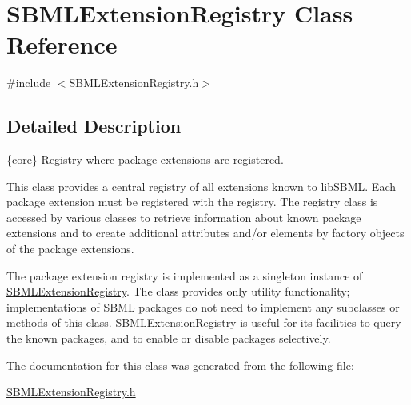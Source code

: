 \hypertarget{class_s_b_m_l_extension_registry}{}\section{S\+B\+M\+L\+Extension\+Registry Class Reference}
\label{class_s_b_m_l_extension_registry}


{\ttfamily \#include $<$S\+B\+M\+L\+Extension\+Registry.\+h$>$}



\subsection{Detailed Description}
\{core\} Registry where package extensions are registered.



This class provides a central registry of all extensions known to lib\+S\+B\+ML. Each package extension must be registered with the registry. The registry class is accessed by various classes to retrieve information about known package extensions and to create additional attributes and/or elements by factory objects of the package extensions.

\begin{DoxyParagraph}{}
The package extension registry is implemented as a singleton instance of \hyperlink{class_s_b_m_l_extension_registry}{S\+B\+M\+L\+Extension\+Registry}. The class provides only utility functionality; implementations of S\+B\+ML packages do not need to implement any subclasses or methods of this class. \hyperlink{class_s_b_m_l_extension_registry}{S\+B\+M\+L\+Extension\+Registry} is useful for its facilities to query the known packages, and to enable or disable packages selectively. 
\end{DoxyParagraph}


The documentation for this class was generated from the following file\+:\begin{DoxyCompactItemize}
\item 
\hyperlink{_s_b_m_l_extension_registry_8h}{S\+B\+M\+L\+Extension\+Registry.\+h}\end{DoxyCompactItemize}
